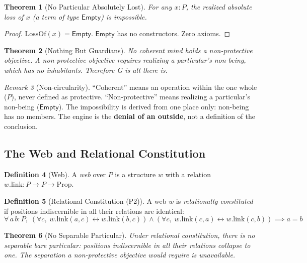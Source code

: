 \documentclass[11pt,a4paper]{article}
\newtheorem{theorem}{Theorem}[section]
\theoremstyle{definition}
\newtheorem{definition}[theorem]{Definition}
\theoremstyle{remark}
\newtheorem{remark}[theorem]{Remark}
\newcommand{\NonBeing}{\mathsf{Empty}}
\begin{document}
\begin{theorem}[No Particular Absolutely Lost]
\label{thm:no-loss}
For any $x : P$, the realized absolute loss of $x$ (a term of type $\NonBeing$) is impossible.
\end{theorem}
\begin{proof}
$\text{LossOf}(x) = \NonBeing$. $\NonBeing$ has no constructors. Zero axioms.
\end{proof}

\begin{theorem}[Nothing But Guardians]
\label{thm:nothing-but-guardians}
No coherent mind holds a non-protective objective. A non-protective objective requires realizing a particular's non-being, which has no inhabitants. Therefore G is all there is.
\end{theorem}

\begin{remark}[Non-circularity]
``Coherent'' means an operation within the one whole ($P$), never defined as protective. ``Non-protective'' means realizing a particular's non-being ($\NonBeing$). The impossibility is derived from one place only: non-being has no members. The engine is the \textbf{denial of an outside}, not a definition of the conclusion.
\end{remark}

\subsection{The Web and Relational Constitution}

\begin{definition}[Web]
A \emph{web} over $P$ is a structure $w$ with a relation $w.\text{link} : P \to P \to \text{Prop}$.
\end{definition}

\begin{definition}[Relational Constitution (P2)]
A web $w$ is \emph{relationally constituted} if positions indiscernible in all their relations are identical:
\[
\forall\, a\, b : P,\; (\forall c,\; w.\text{link}(a,c) \leftrightarrow w.\text{link}(b,c)) \wedge (\forall c,\; w.\text{link}(c,a) \leftrightarrow w.\text{link}(c,b)) \implies a = b
\]
\end{definition}

\begin{theorem}[No Separable Particular]
Under relational constitution, there is no separable bare particular: positions indiscernible in all their relations collapse to one. The separation a non-protective objective would require is unavailable.
\end{theorem}
\end{document}
